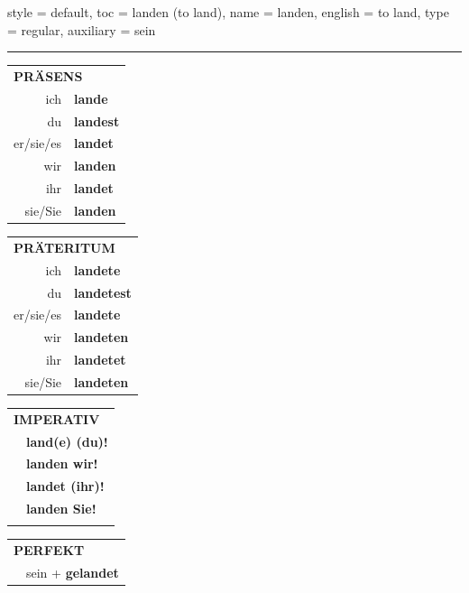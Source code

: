 \begin{verbentry}{
  style = {default},
  toc = {landen (to land)},
  name = {landen},
  english = {to land},
  type = {regular},
  auxiliary = {sein}
}
 
    
     \vspace{5pt}

    \hrule
    
    \vspace{5pt}

  \begin{tabular}{rl}
     \multicolumn{2}{l}{\textbf{PRÄSENS} }\\
    ich & \textbf{lande}\\
    du & \textbf{landest}\\
    er/sie/es & \textbf{landet}\\
    wir & \textbf{landen}\\
    ihr & \textbf{landet}\\
    sie/Sie & \textbf{landen}\\
  \end{tabular}
  \hfill
     \begin{tabular}{rl}
    \multicolumn{2}{l}{\textbf{PRÄTERITUM} }\\
    ich & \textbf{landete}\\
    du & \textbf{landetest}\\
    er/sie/es & \textbf{landete}\\
    wir & \textbf{landeten}\\
    ihr & \textbf{landetet}\\
    sie/Sie & \textbf{landeten}\\
  \end{tabular}
  \hfill
  \begin{tabular}{rl}
     \multicolumn{2}{l}{\textbf{IMPERATIV} }\\
   & \textbf{land(e) (du)!}\\
   & \textbf{landen wir!}\\
   & \textbf{landet (ihr)!}\\
   & \textbf{landen Sie!}\\
   & \vspace{10pt}
  \end{tabular}

    \vspace{10pt}

 \begin{tabular}{rl}
     \multicolumn{2}{l}{\textbf{PERFEKT}}\\
   & sein + \textbf{gelandet}\\
  \end{tabular}
\hfill
   \begin{tabular}{rl}
   

\end{tabular}
\end{verbentry}
